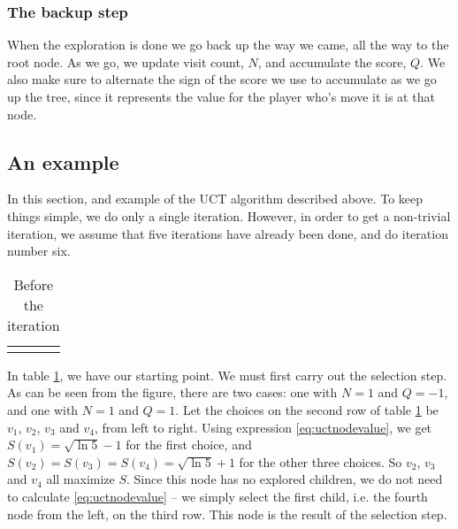 \subsubsection{The backup step}

When the exploration is done  we go back up the way we came, all the way to the root node.
As we go, we update visit count, $N$, and accumulate the score, $Q$.
We also make sure to alternate the sign of the score we use to accumulate as we go up the tree, since it represents the value for the player who's move it is at that node.

\subsection{An example}
In this section, and example of the UCT algorithm described above.
To keep things simple, we do only a single iteration.
However, in order to get a non-trivial iteration, we assume that five iterations have already been done, and do iteration number six.
\begin{center}
\def\arraystretch{5.5}
\begin{table}
\begin{tabular}{l}
  \def\svgwidth{\columnwidth} 
\end{tabular}
\caption{Before the iteration}
\label{tab:mcts_iteration_before}
\end{table}
\end{center}
In table \ref{tab:mcts_iteration_before}, we have our starting point.
We must first carry out the selection step. As can be seen from the figure, there are two cases: one with $N=1$ and $Q=-1$, and one with $N=1$ and $Q=1$.
Let the choices on the second row of table \ref{tab:mcts_iteration_before} be $v_1$, $v_2$, $v_3$ and $v_4$, from left to right.
Using expression \ref{eq:uctnodevalue}, we get $S(v_1) = \sqrt{\ln{5}} - 1$ for the first choice, and $S(v_2) = S(v_3) = S(v_4) = \sqrt{\ln{5}} + 1$ for the other three choices.
So $v_2$, $v_3$ and $v_4$ all maximize $S$.
Since this node has no explored children, we do not need to calculate \ref{eq:uctnodevalue} -- we simply select the first child, i.e. the fourth node from the left, on the third row.
This node is the result of the selection step.

